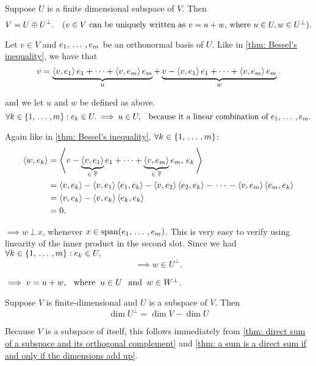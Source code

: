 \begin{thm}
  \label{thm: direct sum of a subspace and its orthogonal complement}
  Suppose $U$ is a finite dimensional subspace of $V$. Then
  \[
    V = U \oplus U^{\bot}. \quad (v \in V $ can be uniquely written as $ v=u+w, $ where $ u\in U, w\in U^{\bot}).
  \]
\end{thm}
\begin{prf}
  Let $v \in V$ and $e_1, {\, \ldots \,\,}, e_m$ be an orthonormal basis of $U$. Like in \ref{thm: Bessel's inequality}, we have that
  \[
    v= \underbrace{\left \langle v, e_1 \right \rangle e_1 + \cdots + \left \langle v, e_m \right \rangle e_m}_u + \underbrace{v - \left \langle v, e_1 \right \rangle e_1 + \cdots + \left \langle v, e_m \right \rangle e_m}_w.
  \]

  and we let $u$ and $w$ be defined as above.
  \[
    \forall k \in \{1, \ddd, m\}: e_k \in U. \implies u \in U, \quad $because it a linear combination of $e_1, \ddd, e_m.
  \]

  Again like in \ref{thm: Bessel's inequality}, $\forall k \in \{1, {\, \ldots \,\,}, m\}$:
  \begin{equation}
    \begin{aligned}
      \left \langle w, e_k \right \rangle
      &=\left \langle v - \underbrace{\left \langle v, e_1 \right \rangle}_{\in \; \mathbb{F}}e_1 + \cdots + \underbrace{\left \langle v, e_m \right \rangle}_{\in \; \mathbb{F}} e_m,  \,e_k \, \right \rangle \\
      &=\left \langle v, e_k \right \rangle - \left \langle v, e_1 \right \rangle\left \langle e_1, e_k \right \rangle - \left \langle v, e_2 \right \rangle\left \langle e_2, e_k \right \rangle - \, \cdots \, - \left \langle v, e_m \right \rangle\left \langle e_m, e_k \right \rangle \\
      &=\left \langle v, e_k \right \rangle - \left \langle v, e_k \right \rangle\left \langle e_k, e_k \right \rangle \\
      &=0.
    \end{aligned}
  \end{equation}

  $\implies w \, \bot \, x$, whenever $x \in \operatorname{span} (e_1, {\, \ldots \,\,}, e_m)$. This is very easy to verify using linearity of the inner product in the second slot. Since we had $\forall k \in \{1, {\, \ldots \,\,}, m \}: e_k \in U,$
  \[
    \implies w \in U^{\bot}.
  \]

  $\implies v = u + w, \;\;\, \text{where}\;\; u \in U \;\;\, \text{and}\;\; w \in W^{\bot}$.
\end{prf}

\begin{thm}
  Suppose $V$ is finite-dimensional and $U$ is a subspace of $V$. Then
  \[
    \dim U^{\bot} = \dim V - \dim U
  \]
\end{thm}
\begin{prf}
  Because $V$ is a subspace of itself, this follows immediately from \ref{thm: direct sum of a subspace and its orthogonal complement} and \ref{thm: a sum is a direct sum if and only if the dimensions add up}.
\end{prf}

